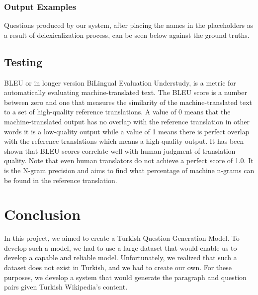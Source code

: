 \documentclass{mefsdp}
\begin{document}
	\subsubsection{Output Examples}
	Questions produced by our system, after placing the names in the placeholders as a result of delexicalization process, can be seen below against the ground truths. 
	\newline
	
	\noindent
	\newline
	
	\noindent
	\newline

	\noindent
	
	\subsection{Testing}
	BLEU or in longer version BiLingual Evaluation Understudy, is a metric for automatically evaluating machine-translated text. The BLEU score is a number between zero and one that measures the similarity of the machine-translated text to a set of high-quality reference translations. A value of 0 means that the machine-translated output has no overlap with the reference translation in other words it is a low-quality output while a value of 1 means there is perfect overlap with the reference translations which means a high-quality output. It has been shown that BLEU scores correlate well with human judgment of translation quality. Note that even human translators do not achieve a perfect score of 1.0. It is the N-gram precision and aims to find what percentage of machine n-grams can be found in the reference translation.
	
	\section{Conclusion}
	In this project, we aimed to create a Turkish Question Generation Model. To develop such a model, we had to use a large dataset that would enable us to develop a capable and reliable model. Unfortunately, we realized that such a dataset does not exist in Turkish, and we had to create our own. For these purposes, we develop a system that would generate the paragraph and question pairs given Turkish Wikipedia's content. \newline \par
	
\end{document}

